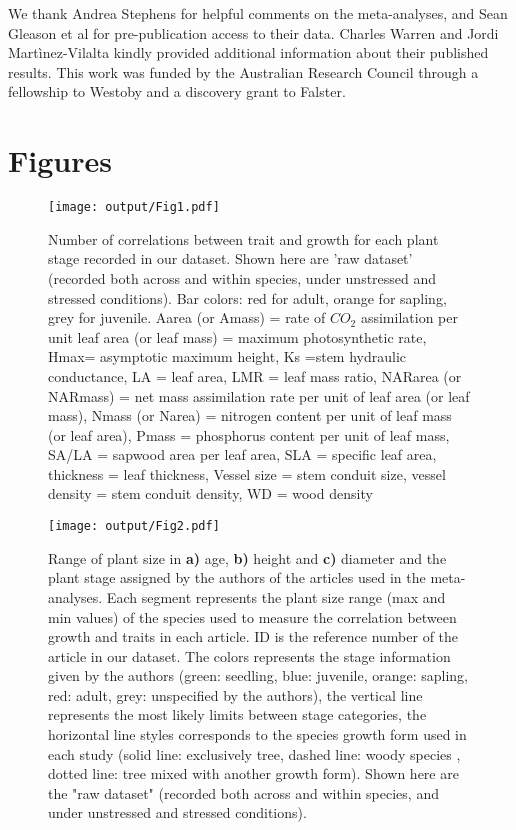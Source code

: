 \documentclass[a4paper]{article}\usepackage[]{graphicx}\usepackage[]{color}
\begin{document}
We thank Andrea Stephens for helpful comments on the meta-analyses, and Sean Gleason et al for pre-publication access to their data. Charles Warren and Jordi Martìnez-Vilalta kindly provided additional information about their published results. This work was funded by the Australian Research Council through a fellowship to Westoby and a discovery grant to Falster.  

\clearpage
\linespread{1}

\nocite{*}
 
\label{references}


\clearpage
\section*{Figures}

\begin{figure}[h!]
\centering
\texttt{[image: output/Fig1.pdf]}
\caption{Number of correlations between trait and growth for each plant stage recorded in our dataset. Shown here are 'raw dataset' (recorded both across and within species, under unstressed and stressed conditions). Bar colors: red for adult, orange for sapling, grey for juvenile. Aarea (or Amass) = rate of $CO_{2}$ assimilation per unit leaf area (or leaf mass) = maximum photosynthetic rate, Hmax= asymptotic maximum height,  Ks =stem hydraulic conductance, LA = leaf area, LMR = leaf mass ratio, NARarea (or NARmass) = net mass assimilation rate per unit of leaf area (or leaf mass), Nmass (or Narea) = nitrogen content per unit of leaf mass (or leaf area), Pmass = phosphorus content per unit of leaf mass, SA/LA = sapwood area per leaf area, SLA = specific leaf area, thickness = leaf thickness, Vessel size = stem conduit size, vessel density = stem conduit density, WD = wood density}
\label{Fig1}
\end{figure}

\begin{figure}[h!]
\centering
\texttt{[image: output/Fig2.pdf]}
\caption{Range of plant size in \textbf{a)} age, \textbf{b)} height and \textbf{c)} diameter and the plant stage assigned by the authors of the articles used in the meta-analyses. Each segment represents the plant size range (max and min values) of the species used to measure the correlation between growth and traits in each article. ID is the reference number of the article in our dataset. The colors represents the stage information given by the authors (green: seedling, blue: juvenile, orange: sapling, red: adult, grey: unspecified by the authors), the vertical line represents the most likely limits between stage categories, the horizontal line styles corresponds to the species growth form used in each study (solid line: exclusively tree, dashed line: woody species , dotted line: tree mixed with another growth form). Shown here are the "raw dataset" (recorded both across and within species, and under unstressed and stressed conditions).}
\label{Fig2}
\end{figure}
\end{document}
